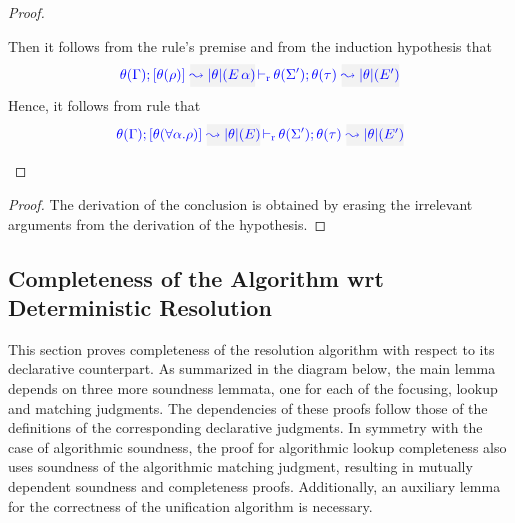 \begin{proof}
\begin{description}
  Then it follows from the rule's premise and from the induction hypothesis that
\begin{equation*}
\dmres{\theta(\tenv)}{\theta(\rulet)}{\etrans\theta(\mmapp{E}{\alpha})}{\theta(\type)}{\etrans{\theta}(E')}{\theta(\Sigma')}
\end{equation*}
  Hence, it follows from rule  that
\begin{equation*}
  \dmres{\theta(\tenv)}{\theta(\tall{\alpha}{\rulet})}{\etrans\theta(E)}{\theta(\type)}{\etrans{\theta}(E')}{\theta(\Sigma')}
\end{equation*}
\end{description}
\end{proof}


{\centering
{}}

\begin{proof}
  The derivation of the conclusion is obtained by erasing the irrelevant arguments
  from the derivation of the hypothesis.
\end{proof}

\subsection{Completeness of the Algorithm wrt Deterministic Resolution}

This section proves completeness of the resolution algorithm with respect to its declarative
counterpart. As summarized in the diagram below, the main lemma depends on three more
soundness lemmata, one for each of the focusing, lookup and matching judgments.
The dependencies of these proofs follow those of the definitions of the
corresponding declarative judgments. In symmetry with the case of algorithmic soundness,
the proof for algorithmic lookup completeness also uses soundness of the algorithmic matching
judgment, resulting in mutually dependent soundness and completeness proofs. Additionally,
an auxiliary lemma for the correctness of the unification algorithm is necessary.

